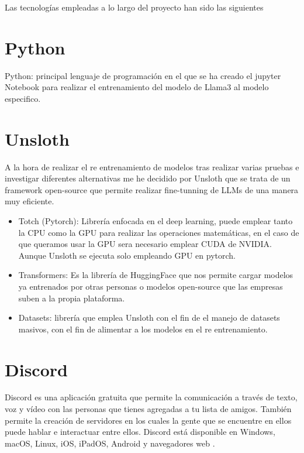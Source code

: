 
Las tecnologías empleadas a lo largo del proyecto han sido las siguientes

\section{Python}
Python: principal lenguaje de programación en el que se ha creado el jupyter Notebook para realizar el entrenamiento del modelo de Llama3 al modelo especifico.

\section{Unsloth}
A la hora de realizar el re entrenamiento de modelos tras realizar varias pruebas e investigar diferentes alternativas me he decidido por Unsloth \cite{Unsloth} que se trata de un framework open-source que permite realizar fine-tunning de LLMs de una manera muy eficiente.

\begin{itemize}
    \item Totch (Pytorch): Librería enfocada en el deep learning, puede emplear tanto la CPU como la GPU para realizar las operaciones matemáticas, en el caso de que queramos usar la GPU sera necesario emplear CUDA de NVIDIA. Aunque Unsloth se ejecuta solo empleando GPU en pytorch.\cite{pytorch}

    \item Transformers: Es la librería de HuggingFace que nos permite cargar modelos ya entrenados por otras personas o modelos open-source que las empresas suben a la propia plataforma.\cite{transformers}

    \item Datasets: librería que emplea Unsloth con el fin de el manejo de datasets masivos, con el fin de alimentar a los modelos en el re entrenamiento.\cite{datasets}
\end{itemize}

\section{Discord}

Discord es una aplicación gratuita que permite la comunicación a través de texto, voz y vídeo con las personas que tienes agregadas a tu lista de amigos. También permite la creación de servidores en los cuales la gente que se encuentre en ellos puede hablar  e interactuar entre ellos. Discord está disponible en Windows, macOS, Linux, iOS, iPadOS, Android y navegadores web \cite{discord}.

